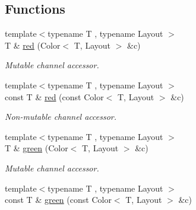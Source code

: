 \subsection*{Functions}
\begin{DoxyCompactItemize}
\item 
\hypertarget{group___channel_accessors_ga757afabac81c17de47404784d892fd3b}{{\footnotesize template$<$typename T , typename Layout $>$ }\\T \& \hyperlink{group___channel_accessors_ga757afabac81c17de47404784d892fd3b}{red} (Color$<$ T, Layout $>$ \&c)}\label{group___channel_accessors_ga757afabac81c17de47404784d892fd3b}

\begin{DoxyCompactList}\small\item\em Mutable channel accessor. \end{DoxyCompactList}\item 
\hypertarget{group___channel_accessors_gaeb571624f9083b6e93caa612efbe33d5}{{\footnotesize template$<$typename T , typename Layout $>$ }\\const T \& \hyperlink{group___channel_accessors_gaeb571624f9083b6e93caa612efbe33d5}{red} (const Color$<$ T, Layout $>$ \&c)}\label{group___channel_accessors_gaeb571624f9083b6e93caa612efbe33d5}

\begin{DoxyCompactList}\small\item\em Non-\/mutable channel accessor. \end{DoxyCompactList}\item 
\hypertarget{group___channel_accessors_gae8bbbd63c7f0aab610b1dd591b415519}{{\footnotesize template$<$typename T , typename Layout $>$ }\\T \& \hyperlink{group___channel_accessors_gae8bbbd63c7f0aab610b1dd591b415519}{green} (Color$<$ T, Layout $>$ \&c)}\label{group___channel_accessors_gae8bbbd63c7f0aab610b1dd591b415519}

\begin{DoxyCompactList}\small\item\em Mutable channel accessor. \end{DoxyCompactList}\item 
\hypertarget{group___channel_accessors_ga5bfc09b28f0f9052e3c133581f6667c3}{{\footnotesize template$<$typename T , typename Layout $>$ }\\const T \& \hyperlink{group___channel_accessors_ga5bfc09b28f0f9052e3c133581f6667c3}{green} (const Color$<$ T, Layout $>$ \&c)}\label{group___channel_accessors_ga5bfc09b28f0f9052e3c133581f6667c3}


\end{DoxyCompactItemize}
